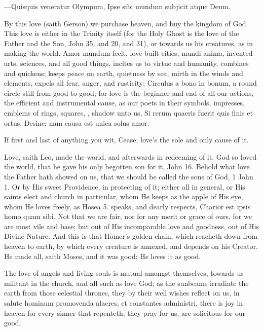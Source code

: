 {---Quisquis veneratur Olympum,
Ipse sibi mundum subjicit atque Deum.

By this love (saith Gerson) we purchase heaven, and buy the
kingdom of God. This love is either in the Trinity itself (for
the Holy Ghost is the love of the Father and the Son, \etc{} John  35,
and  20, and  31), or towards us his creatures, as in making the
world. Amor mundum fecit, love built cities, mundi anima, invented
arts, sciences, and all good things, incites us to virtue and
humanity, combines and quickens; keeps peace on earth, quietness by
sea, mirth in the winds and elements, expels all fear, anger, and
rusticity; Circulus a bono in bonum, a round circle still from good to
good; for love is the beginner and end of all our actions, the
efficient and instrumental cause, as our poets in their symbols,
impresses, emblems of rings, squares, \etc{}, shadow unto us,
Si rerum quaeris fuerit quis finis et ortus,
Desine; nam causa est unica solus amor.

If first and last of anything you wit,
Cease; love's the sole and only cause of it.

Love, saith Leo, made the world, and afterwards in redeeming of
it, God so loved the world, that he gave his only begotten son for it,
John  16. Behold what love the Father hath showed on us, that we
should be called the sons of God, 1 John  1. Or by His sweet
Providence, in protecting of it; either all in general, or His saints
elect and church in particular, whom He keeps as the apple of His eye,
whom He loves freely, as Hosea  5. speaks, and dearly respects,
Charior est ipsis homo quam sibi. Not that we are fair, nor for
any merit or grace of ours, for we are most vile and base; but out of
His incomparable love and goodness, out of His Divine Nature. And this
is that Homer's golden chain, which reacheth down from heaven to earth,
by which every creature is annexed, and depends on his Creator. He made
all, saith Moses, and it was good; He loves it as good.

The love of angels and living souls is mutual amongst themselves,
towards us militant in the church, and all such as love God; as the
sunbeams irradiate the earth from those celestial thrones, they by
their well wishes reflect on us, in salute hominum promovenda
alacres, et constantes administri, there is joy in heaven for every
sinner that repenteth; they pray for us, are solicitous for our good,

}
